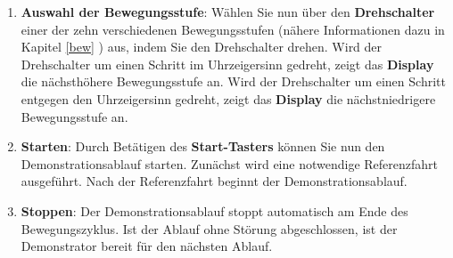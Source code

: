 \begin{enumerate}
\begin{center}
\end{center}
	
	\item \textbf{Auswahl der Bewegungsstufe}: Wählen Sie nun über den \textbf{Drehschalter} einer der zehn verschiedenen Bewegungsstufen (nähere Informationen dazu in Kapitel \ref{bew} ) aus, indem Sie den Drehschalter drehen. Wird der Drehschalter um einen Schritt im Uhrzeigersinn gedreht, zeigt das \textbf{Display} die nächsthöhere Bewegungsstufe an. Wird der Drehschalter um einen Schritt entgegen den Uhrzeigersinn gedreht, zeigt das \textbf{Display} die nächstniedrigere Bewegungsstufe an.	
	
	\item \textbf{Starten}: Durch Betätigen des \textbf{Start-Tasters} können Sie nun den Demonstrationsablauf starten. Zunächst wird eine notwendige Referenzfahrt ausgeführt. Nach der Referenzfahrt beginnt der Demonstrationsablauf.
	\begin{center}	
	\end{center}
	
	\item \textbf{Stoppen}: Der Demonstrationsablauf stoppt automatisch am Ende des Bewegungszyklus. Ist der Ablauf ohne Störung abgeschlossen, ist der Demonstrator bereit für den nächsten Ablauf.
\end{enumerate}



